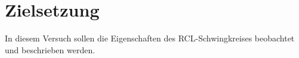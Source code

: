 \section{Zielsetzung}
In diesem Versuch sollen die Eigenschaften des RCL-Schwingkreises beobachtet und beschrieben werden.